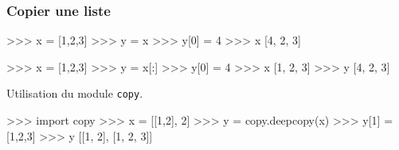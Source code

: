 \begin{frame}[fragile]
\frametitle{Copier une liste}

\begin{minipage}[t]{0.38\linewidth}
\begin{GrayBox}[0.85\textwidth]
\begin{verbatimtab}[3]
>>> x = [1,2,3]
>>> y = x
>>> y[0] = 4
>>> x
[4, 2, 3]
\end{verbatimtab}
\end{GrayBox}
\end{minipage}\hfill
\begin{minipage}[t]{0.58\linewidth}
\begin{GrayBox}[0.85\textwidth]
\begin{verbatimtab}[3]
>>> x = [1,2,3]
>>> y = x[:]
>>> y[0] = 4
>>> x
[1, 2, 3]
>>> y
[4, 2, 3]
\end{verbatimtab}
\end{GrayBox}
\end{minipage}

\begin{minipage}[t]{0.38\linewidth}
Utilisation du module \verb?copy?.
\end{minipage}\hfill
\begin{minipage}[t]{0.58\linewidth}
\vspace{-0.5cm}
\begin{GrayBox}[0.85\textwidth]
\begin{verbatimtab}[3]
>>> import copy
>>> x = [[1,2], 2]
>>> y = copy.deepcopy(x)
>>> y[1] = [1,2,3]
>>> y
[[1, 2], [1, 2, 3]]
\end{verbatimtab}
\end{GrayBox}
\end{minipage}
\end{frame}

